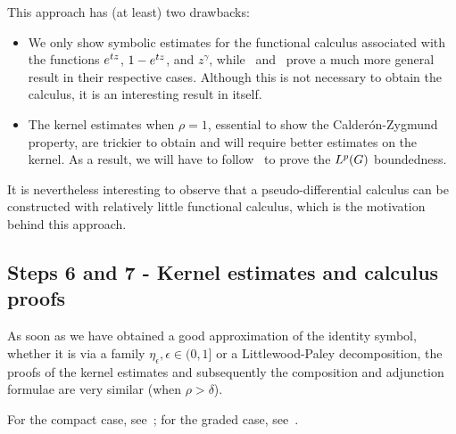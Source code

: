 This approach has (at least) two drawbacks:
\begin{itemize}
    \item
        We only show symbolic estimates for the functional calculus associated with the functions $e^{t z}$,
        $1 - e^{t z}$, and $z^\gamma$,
        while~\cite{FischerRuzhansky16} and~\cite{Fischer2015} prove a much more general result in their respective cases.
        Although this is not necessary to obtain the calculus,
        it is an interesting result in itself.
    \item
        The kernel estimates when $\rho = 1$,
        essential to show the Calder\'on-Zygmund property,
        are trickier to obtain
        and will require better estimates on the kernel.
        As a result,
        we will have to follow~\cite{Fischer2015}
        to prove the ${L^{p} (G)}$ boundedness.
\end{itemize}

It is nevertheless interesting to observe that a pseudo-differential calculus can be constructed with relatively little functional calculus,
which is the motivation behind this approach.

\subsection*{Steps 6 and 7 - Kernel estimates and calculus proofs}

As soon as we have obtained a good approximation of the identity symbol,
whether it is via a family $\eta_\epsilon, \epsilon \in (0, 1]$
or a Littlewood-Paley decomposition,
the proofs of the kernel estimates and subsequently the composition and adjunction formulae are very similar (when $\rho > \delta$).

For the compact case,
see~\cite[Sections 6.3 and 7.3]{Fischer2015};
for the graded case,
see~\cite[Sections 5.4 and 5.5]{FischerRuzhansky16}.
